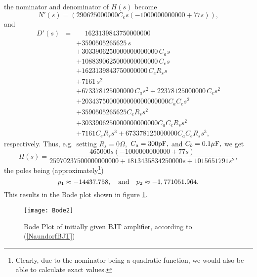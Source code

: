 \documentclass[10pt,twocolumn,pagenumbers]{IEEEtran}
\begin{document}
the nominator and denominator of $H(s)$ become
\begin{equation}
N'(s)=
(290625000000 C_e s (-1000000000000 + 77 s)),
\nonumber
\end{equation}
and
\begin{eqnarray*}
D'(s)&=&\phantom{+} 1623139843750000000 \\
&&+ 3590505265625\, s\\
&& + 3033906250000000000000\, C_a s\\
&& + 1088390625000000000000\, C_e s
\\
&& + 1623139843750000000\, C_e R_s s\\
&& + 7161\, s^2\\
&& + 673378125000000\, C_a s^2 + 22378125000000\, C_e s^2\\
&& + 2034375000000000000000000 C_a C_e s^2\\
&& + 3590505265625 C_e R_s s^2\\ 
&& + 3033906250000000000000 C_a C_e R_s s^2\\
&& + 7161 C_e R_s s^3 + 673378125000000 C_a C_e R_s s^3,
\end{eqnarray*}
\noindent
respectively. Thus, e.g.\ setting $R_s=0\Omega,$ $ C_a= 300\hbox{pF},$ and $C_b=0.1\mu\hbox{F},$ we get
\begin{equation}
H(s)=
\frac{\scriptstyle 465000 s (-1000000000000 + 77 s)}
{\scriptstyle 25970237500000000000 + 
 1813435834250000 s + 1015651791 s^2},
\label{NaundorfBJT}
\end{equation}
\noindent
the poles being (approximately\footnote{Clearly, due to the nominator being a quadratic function, we would also be able to calculate exact values.})
\begin{equation}
p_1\approx - 14437.758, \quad
\hbox{and}
\quad
p_2\approx - 1,771051.964.
\nonumber
\end{equation}
This results in the Bode plot shown in figure \ref{Naundorf1}.

\medskip
\begin{figure}[h!]
\begin{center}
{\texttt{[image: Bode2]}}
\parbox{.9\linewidth}{
\caption{Bode Plot of initially given BJT amplifier, according to (\ref{NaundorfBJT})}
\label{Naundorf1}
}
\vskip -0.4cm
\end{center}
\vskip -0.4cm
\end{figure}
\end{document}
